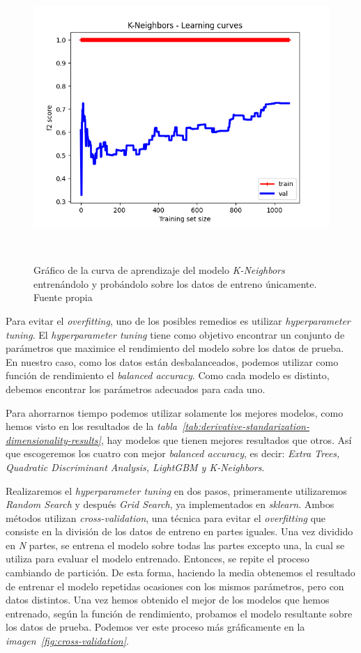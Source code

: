 \begin{figure}[!h]
    \centering
    \includegraphics[width=0.7\linewidth]{media/images/learing-curves-knn.png}
    \caption{Gráfico de la curva de aprendizaje del modelo \textit{K-Neighbors} entrenándolo y probándolo sobre los datos de entreno únicamente. Fuente propia}\ \label{fig:lc-knn}
\end{figure}

Para evitar el \textit{overfitting}, uno de los posibles remedios es utilizar \textit{hyperparameter tuning}. El \textit{hyperparameter tuning} tiene como objetivo encontrar un conjunto de parámetros que maximice el rendimiento del modelo sobre los datos de prueba. En nuestro caso, como los datos están desbalanceados, podemos utilizar como función de rendimiento el \textit{balanced accuracy}. Como cada modelo es distinto, debemos encontrar los parámetros adecuados para cada uno. 

Para ahorrarnos tiempo podemos utilizar solamente los mejores modelos, como hemos visto en los resultados de la \textit{tabla\ \ref{tab:derivative-standarization-dimensionality-results}}, hay modelos que tienen mejores resultados que otros. Así que escogeremos los cuatro con mejor \textit{balanced accuracy}, es decir: \textit{Extra Trees, Quadratic Discriminant Analysis, LightGBM y K-Neighbors}.

Realizaremos el \textit{hyperparameter tuning} en dos pasos, primeramente utilizaremos \textit{Random Search} y después \textit{Grid Search}, ya implementados en \textit{sklearn}.
Ambos métodos utilizan \textit{cross-validation}, una técnica para evitar el \textit{overfitting} que consiste en la división de los datos de entreno en partes iguales.
Una vez dividido en \textit{N} partes, se entrena el modelo sobre todas las partes excepto una, la cual se utiliza para evaluar el modelo entrenado. Entonces, se repite el 
proceso cambiando de partición. De esta forma, haciendo la media obtenemos el resultado de entrenar el modelo repetidas ocasiones con los mismos parámetros, pero con datos 
distintos. Una vez hemos obtenido el mejor de los modelos que hemos entrenado, según la función de rendimiento, probamos el modelo resultante sobre los datos de prueba.
Podemos ver este proceso más gráficamente en la \textit{imagen\ \ref{fig:cross-validation}}.

